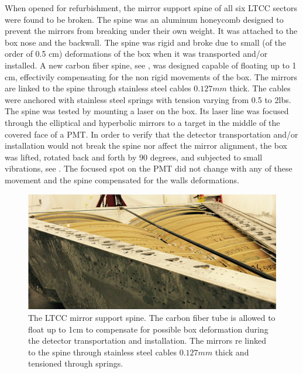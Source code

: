 When opened for refurbishment, the mirror support spine of all six LTCC sectors were found to be broken. The spine was an aluminum honeycomb designed to prevent
the mirrors from breaking under their own weight. It was attached to the box nose and the backwall. The spine was rigid and broke due to small
(of the order of 0.5 cm) deformations of the box when it was transported and/or installed.
A new carbon fiber spine, see , was designed capable of floating up to 1 cm, effectivily compensating for the non rigid movements of the box.
The mirrors are linked to the spine through stainless steel cables $0.127 mm$ thick. The cables were anchored with stainless steel springs with tension varying from 0.5 to 2lbs.
The spine was tested by mounting a laser on the box. Its laser line was focused through the elliptical and hyperbolic mirrors to a target in the middle of the covered face of a PMT.
In order to verify that the detector transportation and/or installation would not break the spine nor affect the mirror alignment, the box was lifted,
rotated back and forth by $90$ degrees, and subjected to small vibrations, see . The focused spot on the PMT did not change with any of these movement and the spine
compensated for the walls deformations.

\begin{figure}
	\centering
	\includegraphics[width=1.0\columnwidth,keepaspectratio]{img/spine.png}
	\caption{The LTCC mirror support spine. The carbon fiber tube is allowed to float up to 1cm to compensate for possible box deformation during the detector
            transportation and installation. The mirrors re linked to the spine through stainless steel cables $0.127 mm$ thick and tensioned through springs.}
	\label{fig:spine}
\end{figure}


